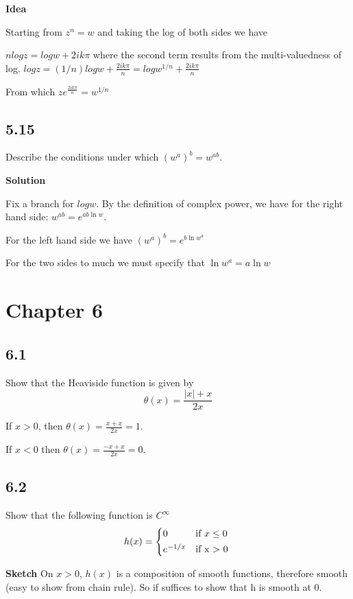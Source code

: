\documentclass[]{article}
\begin{document}
\textbf{Idea}

Starting from $z^n = w$ and taking the log of both sides we have

$nlogz = logw+2ik\pi$ where the second term results from the multi-valuedness of log.
$logz = (1/n)logw + \frac{2ik\pi}{n} = logw^{1/n} + \frac{2ik\pi}{n}$

From which $z e^{\frac{2ik\pi}{n}} = w^{1/n}$


\subsection*{5.15}
Describe the conditions under which $(w^a)^b = w^{ab}$.

\textbf{Solution}

Fix a branch for $logw$. By the definition of complex power, we have for the right hand side: $w^{ab} = e^{ab \ln w}$.


For the left hand side we have $(w^a)^b = e^{b \ln w^a}$

For the two sides to much we must specify that $\ln w^a = a \ln w$

\section*{Chapter 6}

\subsection*{6.1}
Show that the Heaviside function is given by 
$$
\theta(x) = \frac{|x|+x}{2x}
$$

If $x>0$, then $\theta(x) = \frac{x+x}{2x} = 1$.

If $x<0$ then $\theta(x) = \frac{-x+x}{2x} = 0$.

\subsection*{6.2}
Show that the following function is $C^{\infty}$
\begin{equation}
    h(x) =
    \begin{cases*}
      0       & if $x \leq 0$ \\
      e^{-1/x} & if x > 0
    \end{cases*}
\end{equation}

\textbf{Sketch}
On $x>0$, $h(x)$ is a composition of smooth functions, therefore smooth (easy to show from chain rule). So if suffices to show that h is smooth at 0.
\end{document}
